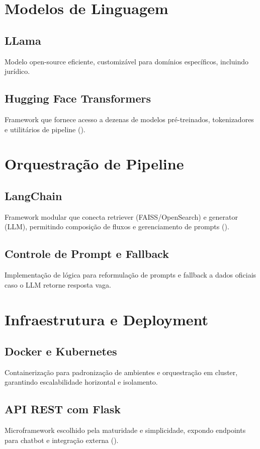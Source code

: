 \begin{description}
\section{Modelos de Linguagem}
\subsection{LLama}
Modelo open-source eficiente, customizável para domínios específicos, incluindo jurídico.

\subsection{Hugging Face Transformers}
Framework que fornece acesso a dezenas de modelos pré-treinados, tokenizadores e utilitários de pipeline (\cite{huggingface2024transformers}).

\section{Orquestração de Pipeline}
\subsection{LangChain}
Framework modular que conecta retriever (FAISS/OpenSearch) e generator (LLM), permitindo composição de fluxos e gerenciamento de prompts (\cite{langchain2024}).

\subsection{Controle de Prompt e Fallback}
Implementação de lógica para reformulação de prompts e fallback a dados oficiais caso o LLM retorne resposta vaga.

\section{Infraestrutura e Deployment}
\subsection{Docker e Kubernetes}
Containerização para padronização de ambientes e orquestração em cluster, garantindo escalabilidade horizontal e isolamento.

\subsection{API REST com Flask}
Microframework escolhido pela maturidade e simplicidade, expondo endpoints para chatbot e integração externa (\cite{flask2024}).



\end{description}
